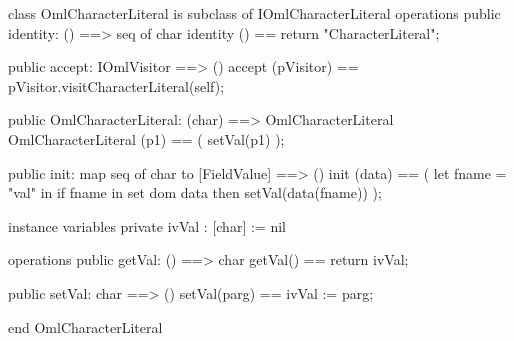 \begin{vdm_al}
class OmlCharacterLiteral is subclass of IOmlCharacterLiteral
operations
  public identity: () ==> seq of char
  identity () == return "CharacterLiteral";

  public accept: IOmlVisitor ==> ()
  accept (pVisitor) == pVisitor.visitCharacterLiteral(self);

  public OmlCharacterLiteral:
      (char) ==> OmlCharacterLiteral
  OmlCharacterLiteral (p1) == 
   ( setVal(p1) );

  public init: map seq of char to [FieldValue] ==> ()
  init (data) ==
    ( let fname = "val" in
        if fname in set dom data
        then setVal(data(fname)) );

instance variables
  private ivVal : [char] := nil

operations
  public getVal: () ==> char
  getVal() == return ivVal;

  public setVal: char ==> ()
  setVal(parg) == ivVal := parg;

end OmlCharacterLiteral
\end{vdm_al}

